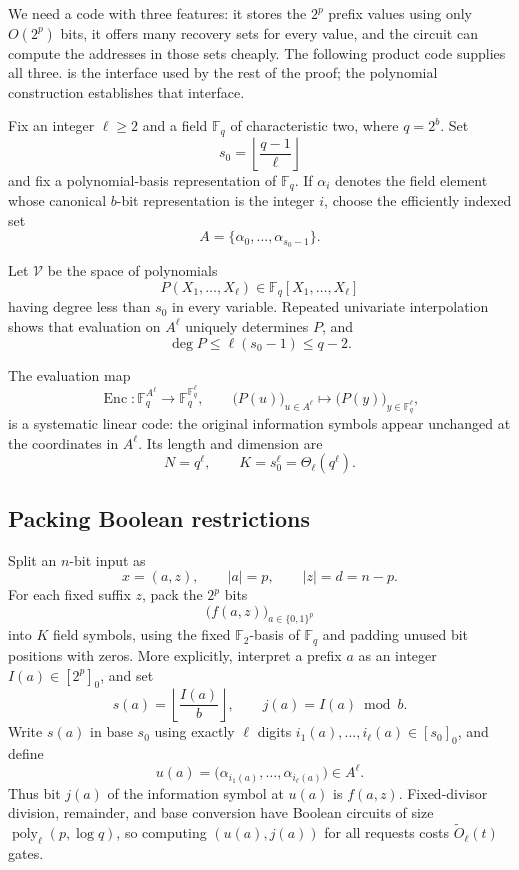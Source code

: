 \documentclass[11pt]{article}
\newcommand{\bits}{\{0,1\}}
\newcommand{\F}{\mathbb{F}}
\newcommand{\poly}{\operatorname{poly}}
\begin{document}
We need a code with three features: it stores the $2^p$ prefix values using
only $O(2^p)$ bits, it offers many recovery sets for every value, and the
circuit can compute the addresses in those sets cheaply.  The following
product code supplies all three.   is the interface
used by the rest of the proof; the polynomial construction establishes that
interface.

Fix an integer $\ell\ge2$ and a field $\F_q$ of characteristic two, where
$q=2^b$.  Set
\[
  s_0=\left\lfloor\frac{q-1}{\ell}\right\rfloor
\]
and fix a polynomial-basis representation of $\F_q$.  If $\alpha_i$ denotes
the field element whose canonical $b$-bit representation is the integer $i$,
choose the efficiently indexed set
\[
  A=\{\alpha_0,\ldots,\alpha_{s_0-1}\}.
\]
\begin{samepage}
Let $\mathcal V$ be the space of polynomials
\[
  P(X_1,\ldots,X_\ell)\in\F_q[X_1,\ldots,X_\ell]
\]
having degree less than $s_0$ in every variable.  Repeated univariate
interpolation shows that evaluation on $A^\ell$ uniquely determines $P$, and
\[
  \deg P\le\ell(s_0-1)\le q-2.
\]
\end{samepage}

The evaluation map
\[
  \operatorname{Enc}:\F_q^{A^\ell}\longrightarrow\F_q^{\F_q^\ell},
  \qquad
  \bigl(P(u)\bigr)_{u\in A^\ell}
  \longmapsto
  \bigl(P(y)\bigr)_{y\in\F_q^\ell},
\]
is a systematic linear code: the original information symbols appear
unchanged at the coordinates in $A^\ell$.  Its length and dimension are
\[
  N=q^\ell,\qquad K=s_0^\ell=\Theta_\ell(q^\ell).
\]

\subsection{Packing Boolean restrictions}\label{subsec:packing}

Split an $n$-bit input as
\[
  x=(a,z),
  \qquad |a|=p,
  \qquad |z|=d=n-p.
\]
For each fixed suffix $z$, pack the $2^p$ bits
\[
  \bigl(f(a,z)\bigr)_{a\in\bits^p}
\]
into $K$ field symbols, using the fixed $\F_2$-basis of $\F_q$ and padding
unused bit positions with zeros.  More explicitly, interpret a prefix $a$ as
an integer $I(a)\in[2^p]_0$, and set
\[
  s(a)=\left\lfloor\frac{I(a)}b\right\rfloor,
  \qquad
  j(a)=I(a)\bmod b.
\]
Write $s(a)$ in base $s_0$ using exactly $\ell$ digits
$i_1(a),\ldots,i_\ell(a)\in[s_0]_0$, and define
\[
  u(a)=\bigl(\alpha_{i_1(a)},\ldots,\alpha_{i_\ell(a)}\bigr)\in A^\ell.
\]
Thus bit $j(a)$ of the information symbol at $u(a)$ is $f(a,z)$.
Fixed-divisor division, remainder, and base conversion have Boolean circuits
of size $\poly_\ell(p,\log q)$, so computing $(u(a),j(a))$ for all requests
costs $\widetilde O_\ell(t)$ gates.
\end{document}
